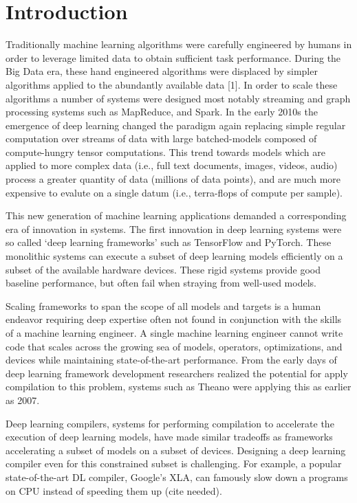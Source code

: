 \chapter{Introduction}
\label{ch:intro}

Traditionally machine learning algorithms were carefully engineered by humans
  in order to leverage limited data to obtain sufficient task performance.
During the Big Data era, these hand engineered algorithms were displaced by
  simpler algorithms applied to the abundantly available data [1].
In order to scale these algorithms a number of systems were
  designed most notably streaming and graph processing systems such as MapReduce, and Spark.
In the early 2010s the emergence of deep learning changed the paradigm again
  replacing simple regular computation over streams of data with large batched-models
  composed of compute-hungry tensor computations.
This trend towards models which are applied to more complex data (i.e., full text documents, images, videos, audio)
  process a greater quantity of data (millions of data points), and are much more expensive to evalute
  on a single datum (i.e., terra-flops of compute per sample).

This new generation of machine learning applications demanded a corresponding era of
  innovation in systems.
The first innovation in deep learning systems were so called
  ‘deep learning frameworks’ such as TensorFlow and PyTorch.
These monolithic systems can execute a subset of deep learning models
  efficiently on a subset of the available hardware devices.
These rigid systems provide good baseline performance, but often fail
  when straying from well-used models.

Scaling frameworks to span the scope of all models and targets is a human endeavor
  requiring deep expertise often not found in conjunction with the skills of a
  machine learning engineer.
A single machine learning engineer cannot write code that scales across the growing
  sea of models, operators, optimizations, and devices while maintaining state-of-the-art
  performance.
From the early days of deep learning framework development researchers realized the
  potential for apply compilation to this problem, systems such as Theano were applying
  this as earlier as 2007.

Deep learning compilers, systems for performing compilation to accelerate the execution
  of deep learning models, have made similar tradeoffs as frameworks accelerating
  a subset of models on a subset of devices.
Designing a deep learning compiler even for this constrained subset is challenging.
For example,
  a popular state-of-the-art DL compiler,
  Google's XLA, can famously slow down a programs on
  CPU instead of speeding them up (cite needed).

